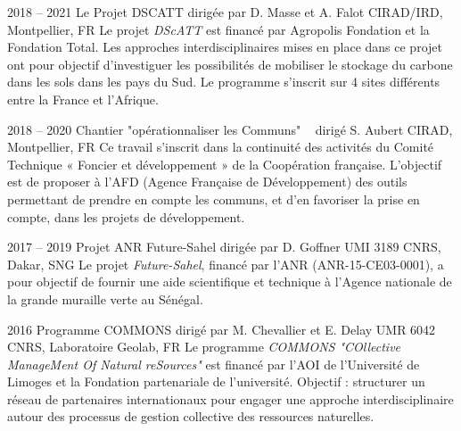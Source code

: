 \documentclass[]{cv-etienne}
\begin{document}
\begin{entrylist}
  \entry
  {2018 -- 2021}
  {Le Projet DSCATT {\normalfont dirigée par D. Masse et A. Falot}}
  {CIRAD/IRD, Montpellier, FR}
  {
  Le projet \emph{DScATT} est financé par Agropolis Fondation et la Fondation Total. Les approches interdisciplinaires mises en place dans ce projet ont pour objectif d'investiguer les possibilités de mobiliser le stockage du carbone dans les sols dans les pays du Sud. Le programme s'inscrit sur 4 sites différents entre la France et l'Afrique.
  }
\end{entrylist}
\begin{entrylist}
  \entry
  {2018 -- 2020}
  {Chantier "opérationnaliser les Communs" {\normalfont ~ dirigé S. Aubert}}
  {CIRAD, Montpellier, FR}
  {
  Ce travail s'inscrit dans la continuité des activités du Comité Technique « Foncier et développement » de la Coopération française. L'objectif est de proposer à l'AFD (Agence Française de Développement) des outils permettant de prendre en compte les communs, et d'en favoriser la prise en compte, dans les projets de développement.
  }
\end{entrylist}
\begin{entrylist}
  \entry
  {2017 -- 2019}
  {Projet ANR Future-Sahel {\normalfont dirigée par D. Goffner}}
  {UMI 3189 CNRS, Dakar, SNG}
  {
  Le projet \emph{Future-Sahel}, financé par l'ANR (ANR-15-CE03-0001), a pour objectif de fournir une aide scientifique et technique à l'Agence nationale de la grande muraille verte au Sénégal.
  }
\end{entrylist}
\begin{entrylist}
  \entry
  {2016}
  {Programme COMMONS {\normalfont dirigé par M. Chevallier et E. Delay}}
  {UMR 6042 CNRS, Laboratoire Geolab, FR}
  {
  Le programme \emph{COMMONS "\textit{COllective ManageMent Of Natural reSources}"} est financé par l'AOI de l'Université de Limoges et la Fondation partenariale de l'université. Objectif : structurer un réseau de partenaires internationaux pour engager une approche interdisciplinaire autour des processus de gestion collective des ressources naturelles.
  }
\end{entrylist}
\end{document}
